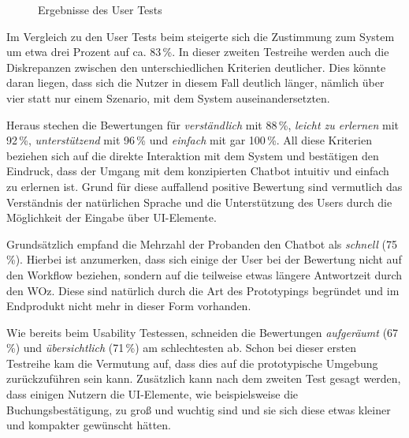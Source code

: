\begin{figure}[htb]
    \caption{Ergebnisse des User Tests}
    \label{fig:diagram-auswertung-user-test}
\end{figure}

Im Vergleich zu den User Tests beim  steigerte sich die Zustimmung zum System um etwa drei Prozent auf ca. 83\,\%. In dieser zweiten Testreihe werden auch die Diskrepanzen zwischen den unterschiedlichen Kriterien deutlicher. Dies könnte daran liegen, dass sich die Nutzer in diesem Fall deutlich länger, nämlich über vier statt nur einem Szenario, mit dem System auseinandersetzten. 

Heraus stechen die Bewertungen für \textit{verständlich} mit 88\,\%, \textit{leicht zu erlernen} mit \mbox{92\,\%}, \textit{unterstützend} mit 96\,\% und \textit{einfach} mit gar 100\,\%. All diese Kriterien beziehen sich auf die direkte Interaktion mit dem System und bestätigen den Eindruck, dass der Umgang mit dem konzipierten Chatbot intuitiv und einfach zu erlernen ist. Grund für diese auffallend positive Bewertung sind vermutlich das Verständnis der natürlichen Sprache und die Unterstützung des Users durch die Möglichkeit der Eingabe über \ac{UI}-Elemente. 

Grundsätzlich empfand die Mehrzahl der Probanden den Chatbot als \textit{schnell} (75\,\%). Hierbei ist anzumerken, dass sich einige der User bei der Bewertung nicht auf den Workflow beziehen, sondern auf die teilweise etwas längere Antwortzeit durch den \acl{WOz}. Diese sind natürlich durch die Art des Prototypings begründet und im Endprodukt nicht mehr in dieser Form vorhanden. 

Wie bereits beim Usability Testessen, schneiden die Bewertungen \textit{aufgeräumt} (67\,\%) und \textit{übersichtlich} (71\,\%) am schlechtesten ab. Schon bei dieser ersten Testreihe kam die Vermutung auf, dass dies auf die prototypische Umgebung zurückzuführen sein kann. Zusätzlich kann nach dem zweiten Test gesagt werden, dass einigen Nutzern die \ac{UI}-Elemente, wie beispielsweise die Buchungsbestätigung, zu groß und wuchtig sind und sie sich diese etwas kleiner und kompakter gewünscht hätten. 

